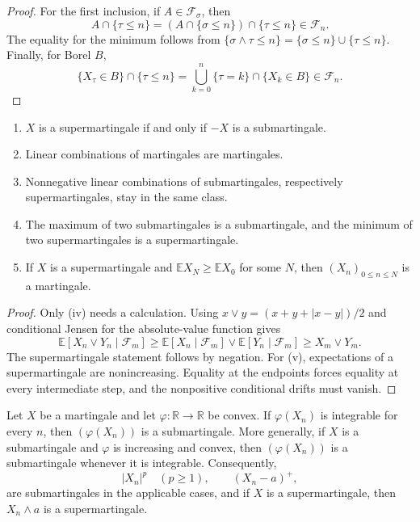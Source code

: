 \begin{proof}
For the first inclusion, if $A\in\mathcal F_\sigma$, then
\[
A\cap\{\tau\leq n\}
 =(A\cap\{\sigma\leq n\})\cap\{\tau\leq n\}\in\mathcal F_n.
\]
The equality for the minimum follows from
$\{\sigma\wedge\tau\leq n\}=
\{\sigma\leq n\}\cup\{\tau\leq n\}$. Finally, for Borel $B$,
\[
\{X_\tau\in B\}\cap\{\tau\leq n\}
 =\bigcup_{k=0}^{n}\{\tau=k\}\cap\{X_k\in B\}\in\mathcal F_n.
\]
\end{proof}

\begin{prop}
\begin{enumerate}[label=(\roman*)]
  \item $X$ is a supermartingale if and only if $-X$ is a submartingale.
  \item Linear combinations of martingales are martingales.
  \item Nonnegative linear combinations of submartingales, respectively
  supermartingales, stay in the same class.
  \item The maximum of two submartingales is a submartingale, and the minimum
  of two supermartingales is a supermartingale.
  \item If $X$ is a supermartingale and
  $\mathbb EX_N\geq\mathbb EX_0$ for some $N$, then $(X_n)_{0\leq n\leq N}$
  is a martingale.
\end{enumerate}
\end{prop}

\begin{proof}
Only (iv) needs a calculation. Using
$x\vee y=(x+y+|x-y|)/2$ and conditional Jensen for the absolute-value
function gives
\[
\mathbb E[X_n\vee Y_n\mid\mathcal F_m]
 \geq\mathbb E[X_n\mid\mathcal F_m]
       \vee\mathbb E[Y_n\mid\mathcal F_m]
 \geq X_m\vee Y_m.
\]
The supermartingale statement follows by negation. For (v), expectations of a
supermartingale are nonincreasing. Equality at the endpoints forces equality
at every intermediate step, and the nonpositive conditional drifts must
vanish.
\end{proof}

\begin{thm}
Let $X$ be a martingale and let $\varphi:\mathbb R\to\mathbb R$ be convex.
If $\varphi(X_n)$ is integrable for every $n$, then
$(\varphi(X_n))$ is a submartingale. More generally, if $X$ is a
submartingale and $\varphi$ is increasing and convex, then
$(\varphi(X_n))$ is a submartingale whenever it is integrable.
Consequently,
\[
|X_n|^p\quad(p\geq1),
\qquad
(X_n-a)^+,
\]
are submartingales in the applicable cases, and if $X$ is a supermartingale,
then $X_n\wedge a$ is a supermartingale.
\end{thm}

